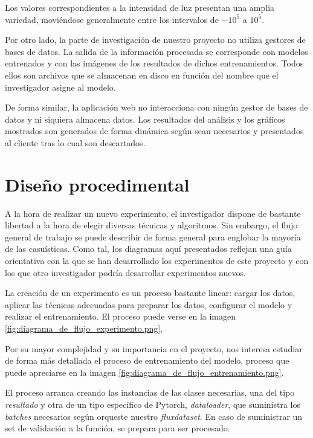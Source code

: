 Los valores correspondientes a la intensidad de luz presentan una amplia variedad, moviéndose generalmente entre los intervalos de $-10^5$ a $10^5$. 


Por otro lado, la parte de investigación de nuestro proyecto no utiliza gestores de bases de datos. La salida de la información procesada se corresponde con modelos entrenados y con las imágenes de los resultados de dichos entrenamientos. Todos ellos son archivos que se almacenan en disco en función del nombre que el investigador asigne al modelo.

De forma similar, la aplicación web no interacciona con ningún gestor de bases de datos y ni siquiera almacena datos. Los resultados del análisis y los gráficos mostrados son generados de forma dinámica según sean necesarios y presentados al cliente tras lo cual son descartados.

\section{Diseño procedimental}

A la hora de realizar un nuevo experimento, el investigador dispone de bastante libertad a la hora de elegir diversas técnicas y algoritmos. Sin embargo, el flujo general de trabajo se puede describir de forma general para englobar la mayoría de las casuísticas. Como tal, los diagramas aquí presentados reflejan una guía orientativa con la que se han desarrollado los experimentos de este proyecto y con los que otro investigador podría desarrollar experimentos nuevos.

La creación de un experimento es un proceso bastante linear: cargar los datos, aplicar las técnicas adecuadas para preparar los datos, configurar el modelo y realizar el entrenamiento. El proceso puede verse en la imagen  \ref{fig:diagrama_de_flujo_experimento.png}.


Por su mayor complejidad y su importancia en el proyecto, nos interesa estudiar de forma más detallada el proceso de entrenamiento del modelo, proceso que puede apreciarse en la imagen  \ref{fig:diagrama_de_flujo_entrenamiento.png}.

El proceso arranca creando las instancias de las clases necesarias, una del tipo \textit{resultado} y otra de un tipo específico de Pytorch, \textit{dataloader}, que suministra los \textit{batches} necesarios según orqueste nuestro \textit{fluxdataset}. En caso de suministrar un set de validación a la función, se prepara para ser procesado.

